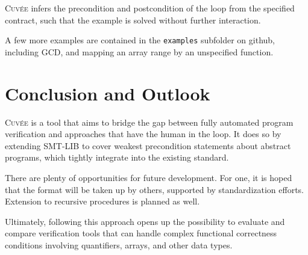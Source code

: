 \documentclass[fleqn]{llncs}
\newcommand{\Cuvee}{\textsc{Cuvée}\xspace}
\newcommand{\code}[1]{\texttt{#1}}
\begin{document}
\Cuvee infers the precondition and postcondition of the loop from the
specified contract, such that the example is solved without further interaction.

A few more examples are contained in the \code{examples} subfolder on github,
including GCD, and mapping an array range by an unspecified function.

\section{Conclusion and Outlook}

\Cuvee is a tool that aims to bridge the gap between fully automated program verification
and approaches that have the human in the loop.
It does so by extending SMT-LIB to cover weakest precondition statements about abstract programs,
which tightly integrate into the existing standard.

There are plenty of opportunities for future development.
For one, it is hoped that the format will be taken up by others,
supported by standardization efforts.
Extension to recursive procedures is planned as well.

Ultimately, following this approach opens up the possibility to evaluate and compare
verification tools that can handle complex functional correctness conditions
involving quantifiers, arrays, and other data types.
\end{document}
